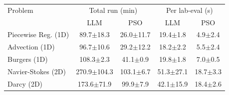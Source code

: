 \begin{tabular}{lcccc}
\toprule
Problem & \multicolumn{2}{c}{Total run (min)} & \multicolumn{2}{c}{Per lab-eval (s)} \\
 & LLM & PSO & LLM & PSO \\
\midrule
Piecewise Reg. (1D) & 89.7$\pm$18.3 & 26.0$\pm$11.7 & 19.4$\pm$1.8 & 4.9$\pm$2.4 \\
Advection (1D) & 96.7$\pm$10.6 & 29.2$\pm$12.2 & 18.2$\pm$2.2 & 5.5$\pm$2.4 \\
Burgers (1D) & 108.3$\pm$2.3 & 41.1$\pm$0.9 & 19.8$\pm$1.8 & 7.0$\pm$0.5 \\
Navier-Stokes (2D) & 270.9$\pm$104.3 & 103.1$\pm$6.7 & 51.3$\pm$27.1 & 18.7$\pm$3.3 \\
Darcy (2D) & 173.6$\pm$71.9 & 99.9$\pm$7.9 & 42.1$\pm$15.9 & 18.4$\pm$2.6 \\
\bottomrule
\end{tabular}